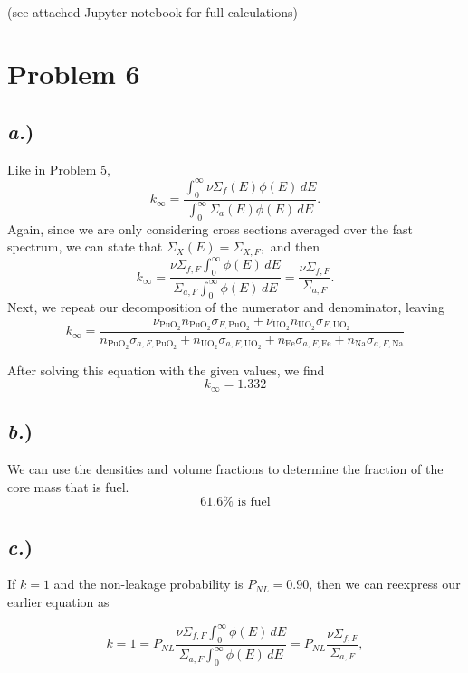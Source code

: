 \documentclass{article}
\begin{document}
\-\\
(see attached Jupyter notebook for full calculations)



\newpage

\section*{Problem 6}

\subsection*{\textit{a.})}

Like in Problem 5, 
$$k_{\infty} = \frac{\int_0^{\infty} \nu \Sigma_f(E)\phi(E)\,dE}{\int_0^{\infty} \Sigma_a(E)\phi(E)\,dE} .$$
Again, since we are only considering cross sections averaged over the fast spectrum, we can state that $\Sigma_X(E) = \Sigma_{X,F},$ and then 
$$ k_{\infty} = \frac{\nu \Sigma_{f,F} \int_0^{\infty} \phi(E)\,dE}{\Sigma_{a,F} \int_0^{\infty} \phi(E)\,dE} = \frac{\nu \Sigma_{f,F}}{\Sigma_{a,F}}.$$
Next, we repeat our decomposition of the numerator and denominator, leaving 
$$ k_{\infty} = \frac{\nu_{\text{PuO}_2} n_{\text{PuO}_2} \sigma_{F,\text{PuO}_2} + \nu_{\text{UO}_2} n_{\text{UO}_2} \sigma_{F,\text{UO}_2}}{n_{\text{PuO}_2} \sigma_{a,F,\text{PuO}_2} + n_{\text{UO}_2} \sigma_{a,F,\text{UO}_2} + n_{\text{Fe}} \sigma_{a,F,\text{Fe}} + n_{\text{Na}} \sigma_{a,F,\text{Na}}} $$

After solving this equation with the given values, we find
$$\boxed{ k_{\infty} = 1.332 }$$


\subsection*{\textit{b.})}

We can use the densities and volume fractions to determine the fraction of the core mass that is fuel. 
$$\boxed{ 61.6\% \text{ is fuel} }$$


\subsection*{\textit{c.})}

If $k = 1$ and the non-leakage probability is $P_{NL} = 0.90$, then we can reexpress our earlier equation as

$$ k = 1 = P_{NL}\frac{\nu \Sigma_{f,F} \int_0^{\infty} \phi(E)\,dE}{\Sigma_{a,F} \int_0^{\infty} \phi(E)\,dE} = P_{NL}\frac{\nu \Sigma_{f,F}}{\Sigma_{a,F}},$$
\end{document}
